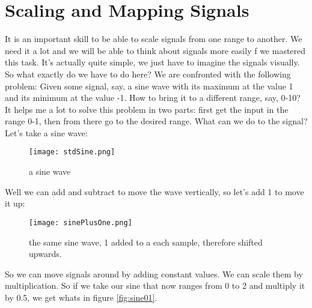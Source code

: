 

\section{Scaling and Mapping Signals}
It is an important skill to be able to scale signals from one range to another. We need it a lot and we will be able to think about signals more easily f we mastered this task. It's actually quite simple, we just have to imagine the signals visually.\\
So what exactly do we have to do here? We are confronted with the following problem: Given some signal, say, a sine wave with its maximum at the value 1 and its minimum at the value -1. How to bring it to a different range, say, 0-10?\\
It helps me a lot to solve this problem in two parts: first get the input in the range 0-1, then from there go to the desired range. What can we do to the signal? Let's take a sine wave:

\begin{figure}[h!]
	\centering
	\texttt{[image: stdSine.png]}
	\caption[a sine wave]
	{a sine wave}
	\label{fig:aSine}
\end{figure}
Well we can add and subtract to move the wave vertically, so let's add 1 to move it up:

\begin{figure}[h!]
	\centering
	\texttt{[image: sinePlusOne.png]}
	\caption[a sine wave]
	{the same sine wave, 1 added to a each sample, therefore shifted upwards.}
	\label{fig:aShiftedSine}
\end{figure}

So we can move signals around by adding constant values. We can scale them by multiplication. So if we take our sine that now ranges from 0 to 2 and multiply it by 0.5, we get whats in figure \ref{fig:sine01}.

